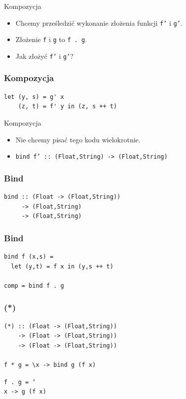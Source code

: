 \documentclass[14pt]{beamer}
\begin{document}
\begin{frame}{Kompozycja}
    \begin{itemize}
        \item Chcemy prześledzić wykonanie złożenia funkcji \texttt{f'}
            i \texttt{g'}.
        \item Złożenie \texttt{f} i \texttt{g} to \texttt{f . g}.
        \item Jak złożyć \texttt{f'} i \texttt{g'}?
    \end{itemize}
\end{frame}

\begin{frame}[fragile]
\frametitle{Kompozycja}
\begin{verbatim}
let (y, s) = g' x
    (z, t) = f' y in (z, s ++ t)
\end{verbatim}
\end{frame}

\begin{frame}{Kompozycja}
    \begin{itemize}
        \item Nie chcemy pisać tego kodu wielokrotnie.
        \item \texttt{bind f' :: (Float,String) -> (Float,String)}
    \end{itemize}
\end{frame}

\begin{frame}[fragile]
\frametitle{Bind}
\begin{verbatim}
bind :: (Float -> (Float,String))
     -> (Float,String)
     -> (Float,String)
\end{verbatim}
\end{frame}

\begin{frame}[fragile]
\frametitle{Bind}
\begin{verbatim}
bind f (x,s) =
  let (y,t) = f x in (y,s ++ t)

comp = bind f . g
\end{verbatim}
\end{frame}

\begin{frame}[fragile]
\frametitle{(*)}
\begin{verbatim}
(*) :: (Float -> (Float,String))
    -> (Float -> (Float,String))
    -> (Float -> (Float,String))

f * g = \x -> bind g (f x)
\end{verbatim}
\pause

\texttt{f . g = \char`\\x -> g (f x)}
\end{frame}
\end{document}
